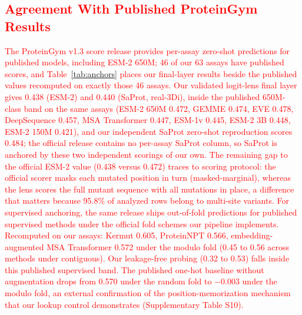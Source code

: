 \documentclass[11pt,a4paper]{article}
\newcommand{\rev}[1]{\textcolor{red}{#1}}
\begin{document}
\textcolor{red}{\subsection{\rev{Agreement With Published ProteinGym Results}}
\label{sec:anchors}}

\textcolor{red}{\rev{The ProteinGym v1.3 score release provides per-assay zero-shot
predictions for published models, including ESM-2 650M; 46 of our 63
assays have published scores, and Table~\ref{tab:anchors} places our
final-layer results beside the published values recomputed on exactly
those 46 assays. Our validated logit-lens final layer gives 0.438 (ESM-2)
and 0.440 (SaProt, real-3Di), inside the published 650M-class band on the
same assays (ESM-2 650M 0.472, GEMME 0.474, EVE 0.478, DeepSequence
0.457, MSA Transformer 0.447, ESM-1v 0.445, ESM-2 3B 0.448, ESM-2 150M
0.421), and our independent SaProt zero-shot reproduction scores 0.484;
the official release contains no per-assay SaProt column, so SaProt is
anchored by these two independent scorings of our own. The remaining gap
to the official ESM-2 value (0.438 versus 0.472) traces to scoring
protocol: the official scorer masks each mutated position in turn
(masked-marginal), whereas the lens scores the full mutant sequence with
all mutations in place, a difference that matters because 95.8\% of
analyzed rows belong to multi-site variants. For supervised anchoring,
the same release ships out-of-fold predictions for published supervised
methods under the official fold schemes our pipeline implements.
Recomputed on our assays: Kermut 0.605, ProteinNPT 0.566,
embedding-augmented MSA Transformer 0.572 under the modulo fold (0.45 to
0.56 across methods under contiguous). Our leakage-free probing (0.32 to
0.53) falls inside this published supervised band. The published
one-hot baseline without augmentation drops from 0.570 under the random
fold to $-0.003$ under the modulo fold, an external confirmation of the
position-memorization mechanism that our lookup control demonstrates
(Supplementary Table S10).}}
\end{document}
